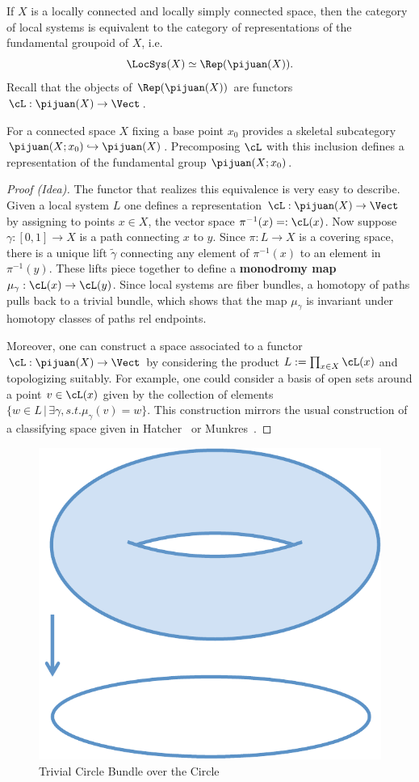 \begin{thm}
If $X$ is a locally connected and locally simply connected space, then the category of local systems is equivalent to the category of representations of the fundamental groupoid of $X$, i.e. 
\[
\LocSys(X)\simeq \Rep(\pijuan(X)).
\]
Recall that the objects of $\Rep(\pijuan(X))$ are functors $\cL:\pijuan(X)\to \Vect$.
\end{thm}
\begin{rmk}
For a connected space $X$ fixing a base point $x_0$ provides a skeletal subcategory $\pijuan(X;x_0)\hookrightarrow \pijuan(X)$. Precomposing $\cL$ with this inclusion defines a representation of the fundamental group $\pijuan(X;x_0)$.
\end{rmk}
\begin{proof}[Proof (Idea)]
The functor that realizes this equivalence is very easy to describe. Given a local system $L$ one defines a representation $\cL:\pijuan(X)\to\Vect$ by assigning to points $x\in X$, the vector space $\pi^{-1}(x)=:\cL(x)$. Now suppose $\gamma:[0,1]\to X$ is a path connecting $x$ to $y$. Since $\pi:L\to X$ is a covering space, there is a unique lift $\tilde{\gamma}$ connecting any element of $\pi^{-1}(x)$ to an element in $\pi^{-1}(y)$. These lifts piece together to define a \textbf{monodromy map} $\mu_{\gamma}:\cL(x)\to\cL(y)$. Since local systems are fiber bundles, a homotopy of paths pulls back to a trivial bundle, which shows that the map $\mu_{\gamma}$ is invariant under homotopy classes of paths rel endpoints.

Moreover, one can construct a space associated to a functor $\cL:\pijuan(X)\to\Vect$ by considering the product $L:=\prod_{x\in X}\cL(x)$ and topologizing suitably. For example, one could consider a basis of open sets around a point $v\in \cL(x)$ given by the collection of elements $\{w\in L\,|\,\exists\gamma, s.t. \mu_{\gamma}(v)=w\}$. This construction mirrors the usual construction of a classifying space given in Hatcher~\cite[Sec. 1.3]{hatcher} or Munkres~\cite[Ch. 13]{munkres}.
\end{proof}

\begin{figure}
\centering
\includegraphics[width=.6\textwidth]{circle_bundle_shaded.pdf}
\caption{Trivial Circle Bundle over the Circle}
\label{fig:circle_bundle}
\end{figure}

